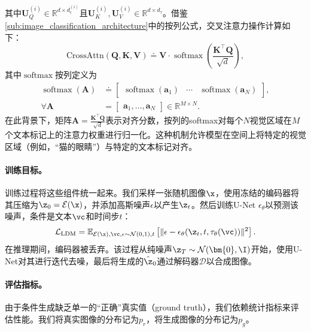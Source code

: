\documentclass[../../book-main_zh.tex]{subfiles}
\begin{document}
\begin{itemize}
    其中$\boldsymbol{U}^{(i)}_{Q} \in \mathbb{R}^{d \times d_\epsilon^{(i)}}$且$\boldsymbol{U}^{(i)}_{K}, \boldsymbol{U}^{(i)}_{V} \in \mathbb{R}^{d \times d_\tau}$。借鉴\eqref{sub:image_classification_architecture}中的按列公式，交叉注意力操作计算如下：
    \begin{equation}
        \text{CrossAttn}(\boldsymbol{Q}, \boldsymbol{K}, \boldsymbol{V}) \doteq \boldsymbol{V} \cdot \operatorname{softmax}\left( \frac{\boldsymbol{K}^\top \boldsymbol{Q}}{\sqrt{d}} \right),
    \end{equation}
    其中$\operatorname{softmax}$按列定义为
    \begin{align}
        \operatorname{softmax}(\boldsymbol{A})
        &\doteq \begin{bmatrix} \operatorname{softmax}(\boldsymbol{a}_{1}) & \cdots & \operatorname{softmax}(\boldsymbol{a}_{N}) \end{bmatrix}, \\
        \forall \boldsymbol{A}
        &= \begin{bmatrix} \boldsymbol{a}_{1}, \dots, \boldsymbol{a}_{N} \end{bmatrix} \in \mathbb{R}^{M \times N}.
    \end{align}
    在此背景下，矩阵$\boldsymbol{A} = \frac{\boldsymbol{K}^\top \boldsymbol{Q}}{\sqrt{d}}$表示对齐分数，按列的softmax对每个$N$视觉区域在$M$个文本标记上的注意力权重进行归一化。这种机制允许模型在空间上将特定的视觉区域（例如，“猫的眼睛”）与特定的文本标记对齐。
\end{itemize}

\paragraph{训练目标。}
训练过程将这些组件统一起来。我们采样一张随机图像$\x$，使用冻结的编码器将其压缩为$\z_0 = \mathcal{E}(\x)$，并添加高斯噪声$\epsilon$以产生$\z_t$。然后训练U-Net $\epsilon_\theta$以预测该噪声，条件是文本$\vc$和时间步$t$：
\begin{equation}
\mathcal{L}_{\text{LDM}} = \mathbb{E}_{\mathcal{E}(\x), \vc, \epsilon \sim \mathcal{N}(0,1), t} \left[ \| \epsilon - \epsilon_\theta(\z_t, t, \tau_\theta(\vc)) \|^2 \right].
\end{equation}
在推理期间，编码器被丢弃。该过程从纯噪声$\z_T \sim \mathcal{N}(\bm{0}, \I)$开始，使用U-Net对其进行迭代去噪，最后将生成的$\hat{\z}_0$通过解码器$\mathcal{D}$以合成图像。




\paragraph{评估指标。}
由于条件生成缺乏单一的“正确”真实值（ground truth），我们依赖统计指标来评估性能。我们将真实图像的分布记为$p_r$，将生成图像的分布记为$p_g$。
\end{document}
